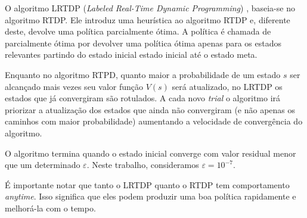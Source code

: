 

O algoritmo LRTDP (\textit{Labeled Real-Time Dynamic Programming}) \cite{Bonet03labeledrtdp}, baseia-se no algoritmo RTDP. Ele introduz uma heurística ao algoritmo RTDP e, diferente deste, devolve uma política parcialmente ótima. A política é chamada de parcialmente ótima por devolver uma política ótima apenas para os estados relevantes partindo do estado inicial estado inicial até o estado meta.

Enquanto no algoritmo RTPD, quanto maior a probabilidade de um estado $s$ ser alcançado mais vezes seu valor função $V(s)$ será atualizado, no LRTDP os estados que já convergiram são rotulados. A cada novo \textit{trial} o algoritmo irá priorizar a atualização dos estados que ainda não convergiram (e não apenas os caminhos com maior probabilidade) aumentando a velocidade de convergência do algoritmo.

O algoritmo termina quando o estado inicial converge com valor residual menor que um determinado $\varepsilon$. Neste trabalho, consideramos $\varepsilon=10^{-7}$.

É importante notar que tanto o LRTDP quanto o RTDP tem comportamento \textit{anytime}. Isso significa que eles podem produzir uma boa política rapidamente e melhorá-la com o tempo.